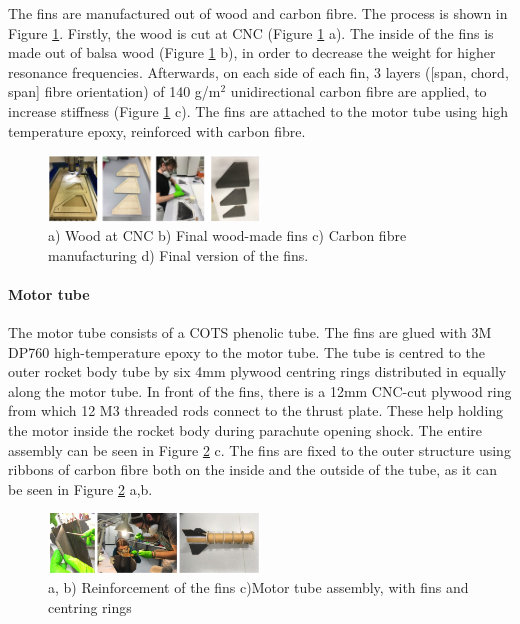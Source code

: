 The fins are manufactured out of wood and carbon fibre. The process is shown in Figure \ref{f:fins}. Firstly, the wood is cut at CNC (Figure \ref{f:fins} a). The inside of the fins is made out of balsa wood (Figure \ref{f:fins} b), in order to decrease the weight for higher resonance frequencies. Afterwards, on each side of each fin, 3 layers ([span, chord, span] fibre orientation) of 140 g/m$^2$ unidirectional carbon fibre are applied, to increase stiffness (Figure \ref{f:fins} c). The fins are attached to the motor tube using high temperature epoxy, reinforced with carbon fibre.

    \begin{figure}[h!]
        \centering
        \includegraphics[width=0.5\textwidth]{img/fins.jpg}
        \caption{a) Wood at CNC b) Final wood-made fins c) Carbon fibre manufacturing d) Final version of the fins.}
        \label{f:fins}
    \end{figure}

\paragraph{Motor tube}
\hfill \break
The motor tube consists of a COTS phenolic tube. The fins are glued with 3M DP760 high-temperature epoxy to the motor tube. The tube is centred to the outer rocket body tube by six 4mm plywood centring rings distributed in equally along the motor tube.
In front of the fins, there is a 12mm CNC-cut plywood ring from which 12 M3 threaded rods connect to the thrust plate. These help holding the motor inside the rocket body during parachute opening shock.
The entire assembly can be seen in Figure \ref{f:reinforcement} c. The fins are fixed to the outer structure using ribbons of carbon fibre both on the inside and the outside of the tube, as it can be seen in Figure \ref{f:reinforcement} a,b.

  \begin{figure}[h!]
\centering
\includegraphics[width=0.5\textwidth]{img/fins_glue.jpg}
\caption{a, b) Reinforcement of the fins c)Motor tube assembly, with fins and centring rings}
\label{f:reinforcement}
\end{figure}


